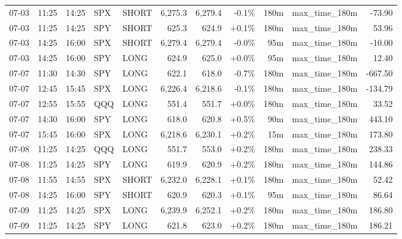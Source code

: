 \documentclass[11pt,a4paper,twoside]{article}
\begin{document}
\begin{center}
\begin{longtable}{>{\color{txtmain}}l l l l l r r r r >{\color{txtmain}}l r}
07-03 & 11:25 & 14:25 & SPX & SHORT & 6,275.3 & 6,279.4 & \textcolor{lossred}{-0.1\%} & 180m & max\_time\_180m & \textcolor{lossred}{-73.90} \\
07-03 & 11:25 & 14:25 & SPY & SHORT & 625.3 & 624.9 & \textcolor{wingreen}{+0.1\%} & 180m & max\_time\_180m & \textcolor{wingreen}{53.96} \\
07-03 & 14:25 & 16:00 & SPX & SHORT & 6,279.4 & 6,279.4 & \textcolor{wingreen}{-0.0\%} & 95m & max\_time\_180m & \textcolor{lossred}{-10.00} \\
07-03 & 14:25 & 16:00 & SPY & LONG & 624.9 & 625.0 & \textcolor{wingreen}{+0.0\%} & 95m & max\_time\_180m & \textcolor{wingreen}{12.40} \\
07-07 & 11:30 & 14:30 & SPY & LONG & 622.1 & 618.0 & \textcolor{lossred}{-0.7\%} & 180m & max\_time\_180m & \textcolor{lossred}{-667.50} \\
07-07 & 12:45 & 15:45 & SPX & LONG & 6,226.4 & 6,218.6 & \textcolor{lossred}{-0.1\%} & 180m & max\_time\_180m & \textcolor{lossred}{-134.79} \\
07-07 & 12:55 & 15:55 & QQQ & LONG & 551.4 & 551.7 & \textcolor{wingreen}{+0.0\%} & 180m & max\_time\_180m & \textcolor{wingreen}{33.52} \\
07-07 & 14:30 & 16:00 & SPY & LONG & 618.0 & 620.8 & \textcolor{wingreen}{+0.5\%} & 90m & max\_time\_180m & \textcolor{wingreen}{443.10} \\
07-07 & 15:45 & 16:00 & SPX & LONG & 6,218.6 & 6,230.1 & \textcolor{wingreen}{+0.2\%} & 15m & max\_time\_180m & \textcolor{wingreen}{173.80} \\
07-08 & 11:25 & 14:25 & QQQ & LONG & 551.7 & 553.0 & \textcolor{wingreen}{+0.2\%} & 180m & max\_time\_180m & \textcolor{wingreen}{238.33} \\
07-08 & 11:25 & 14:25 & SPY & LONG & 619.9 & 620.9 & \textcolor{wingreen}{+0.2\%} & 180m & max\_time\_180m & \textcolor{wingreen}{144.86} \\
07-08 & 11:55 & 14:55 & SPX & SHORT & 6,232.0 & 6,228.1 & \textcolor{wingreen}{+0.1\%} & 180m & max\_time\_180m & \textcolor{wingreen}{52.42} \\
07-08 & 14:25 & 16:00 & SPY & SHORT & 620.9 & 620.3 & \textcolor{wingreen}{+0.1\%} & 95m & max\_time\_180m & \textcolor{wingreen}{86.64} \\
07-09 & 11:25 & 14:25 & SPX & LONG & 6,239.9 & 6,252.1 & \textcolor{wingreen}{+0.2\%} & 180m & max\_time\_180m & \textcolor{wingreen}{186.80} \\
07-09 & 11:25 & 14:25 & SPY & LONG & 621.8 & 623.0 & \textcolor{wingreen}{+0.2\%} & 180m & max\_time\_180m & \textcolor{wingreen}{186.21} \\

\end{longtable}
\end{center}
\end{document}
